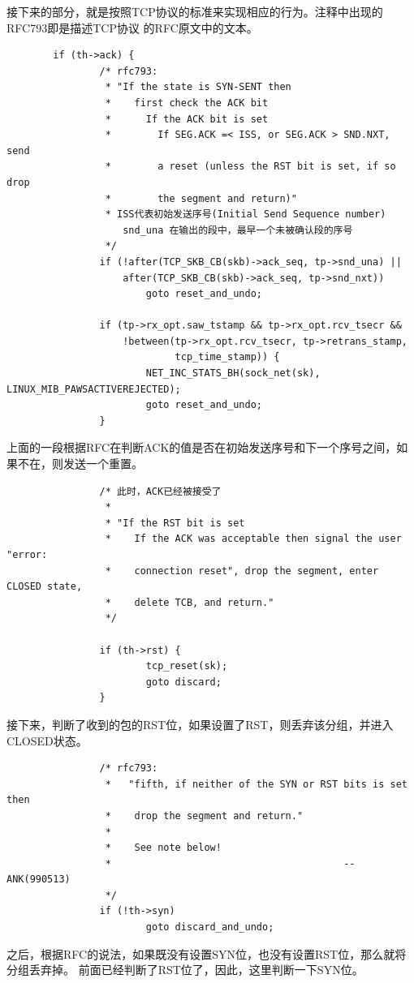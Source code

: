 接下来的部分，就是按照TCP协议的标准来实现相应的行为。注释中出现的RFC793即是描述TCP协议
的RFC原文中的文本。
\begin{verbatim}
        if (th->ack) {
                /* rfc793:
                 * "If the state is SYN-SENT then
                 *    first check the ACK bit
                 *      If the ACK bit is set
                 *        If SEG.ACK =< ISS, or SEG.ACK > SND.NXT, send
                 *        a reset (unless the RST bit is set, if so drop
                 *        the segment and return)"
                 * ISS代表初始发送序号(Initial Send Sequence number)
                    snd_una 在输出的段中，最早一个未被确认段的序号
                 */
                if (!after(TCP_SKB_CB(skb)->ack_seq, tp->snd_una) ||
                    after(TCP_SKB_CB(skb)->ack_seq, tp->snd_nxt))
                        goto reset_and_undo;

                if (tp->rx_opt.saw_tstamp && tp->rx_opt.rcv_tsecr &&
                    !between(tp->rx_opt.rcv_tsecr, tp->retrans_stamp,
                             tcp_time_stamp)) {
                        NET_INC_STATS_BH(sock_net(sk), LINUX_MIB_PAWSACTIVEREJECTED);
                        goto reset_and_undo;
                }
\end{verbatim}
上面的一段根据RFC在判断ACK的值是否在初始发送序号和下一个序号之间，如果不在，则发送一个重置。
\begin{verbatim}
                /* 此时，ACK已经被接受了
                 *
                 * "If the RST bit is set
                 *    If the ACK was acceptable then signal the user "error:
                 *    connection reset", drop the segment, enter CLOSED state,
                 *    delete TCB, and return."
                 */

                if (th->rst) {
                        tcp_reset(sk);
                        goto discard;
                }
\end{verbatim}
接下来，判断了收到的包的RST位，如果设置了RST，则丢弃该分组，并进入CLOSED状态。
\begin{verbatim}
                /* rfc793:
                 *   "fifth, if neither of the SYN or RST bits is set then
                 *    drop the segment and return."
                 *
                 *    See note below!
                 *                                        --ANK(990513)
                 */
                if (!th->syn)
                        goto discard_and_undo;
\end{verbatim}
之后，根据RFC的说法，如果既没有设置SYN位，也没有设置RST位，那么就将分组丢弃掉。
前面已经判断了RST位了，因此，这里判断一下SYN位。

